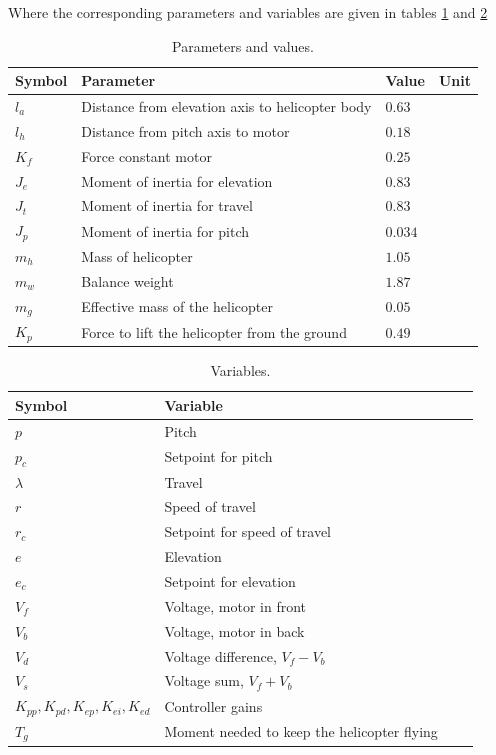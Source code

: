 \documentclass[11pt,a4paper,USenglish]{article} %
\begin{document}
Where the corresponding parameters and variables are given in tables \ref{tab:parameters} and \ref{tab:variables}
\begin{table}[h]
	\centering
	\caption{Parameters and values.}
	\begin{tabular}{llll}
		\hline
		Symbol & Parameter & Value & Unit \\
		\hline
		$l_a$ & Distance from elevation axis to helicopter body & $0.63$ & \meter \\
		$l_h$ & Distance from pitch axis to motor & $0.18$ & \meter \\
		$K_f$ & Force constant motor & $0.25$ & \newton\per\volt \\
		$J_e$ & Moment of inertia for elevation & $0.83$ & \kilogram\usk\square\meter \\
		$J_t$ & Moment of inertia for travel & $0.83$ & \kilogram\usk\square\meter \\
		$J_p$ & Moment of inertia for pitch & $0.034$ & \kilogram\usk\square\meter \\
		$m_h$ & Mass of helicopter & $1.05$ & \kilogram \\
		$m_w$ & Balance weight & $1.87$ & \kilogram \\
		$m_g$ & Effective mass of the helicopter & $0.05$ & \kilogram \\
		$K_p$ & Force to lift the helicopter from the ground & $0.49$ & \newton \\
		\hline
	\end{tabular}
	\label{tab:parameters}
\end{table}

\begin{table}[h]
	\centering
	\caption{Variables.}
	\begin{tabular}{llll}
		\hline
		Symbol & Variable \\
		\hline
		$p$ & Pitch\\
		$p_c$ & Setpoint for pitch\\
		$\lambda$ & Travel\\
		$r$ & Speed of travel\\
		$r_c$ & Setpoint for speed of travel\\
		$e$ & Elevation\\
        $e_c$ & Setpoint for elevation\\
		$V_f$ & Voltage, motor in front\\
		$V_b$ & Voltage, motor in back\\
		$V_d$ & Voltage difference, $V_f - V_b$\\
        $V_s$ & Voltage sum, $V_f + V_b$\\
        $K_{pp}, K_{pd}, K_{ep}, K_{ei}, K_{ed}$ & Controller gains\\
        $T_g$ & Moment needed to keep the helicopter flying\\
		\hline
	\end{tabular}
	\label{tab:variables}
\end{table}
\end{document}
